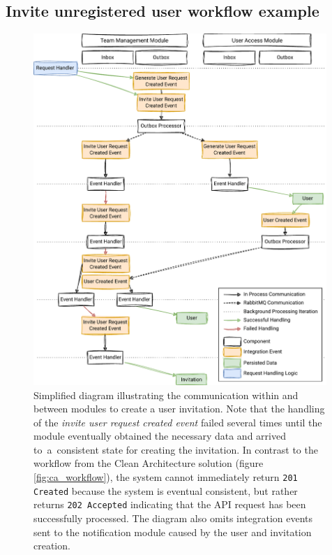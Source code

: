 \subsection{Invite unregistered user workflow example}
\vspace{-10pt}
\begin{figure} [H]
    \centering
    \includegraphics[width=0.99\textwidth]{figures/mm-workflow.pdf}
    \caption{Simplified diagram illustrating the communication within and between modules to create a user invitation. Note that the handling of the \textit{invite user request created event} failed several times until the module eventually obtained the necessary data and arrived to~a~consistent state for creating the invitation. In contrast to the workflow from the Clean Architecture solution (figure \ref{fig:ca_workflow}), the system cannot immediately return \texttt{201 Created} because the system is eventual consistent, but rather returns \texttt{202 Accepted} indicating that the API request has been successfully processed. The diagram also omits integration events sent to the notification module caused by the user and invitation creation.}
    \label{fig:mm_workflow}
\end{figure}

